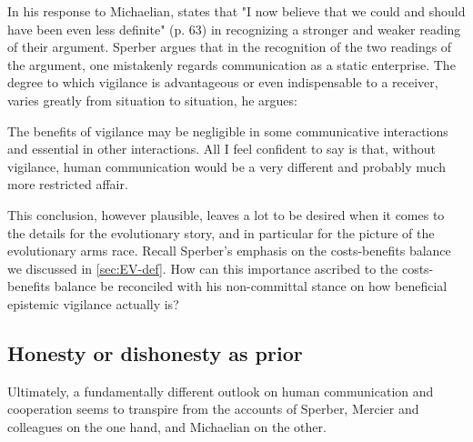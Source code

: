 In his response to Michaelian, \citet{Sperber13} states that "I now believe that we could and should have been even less definite" (p. 63) in recognizing a stronger and weaker reading of their argument. Sperber argues that in the recognition of the two readings of the argument, one mistakenly regards communication as a static enterprise. The degree to which vigilance is advantageous or even indispensable to a receiver, varies greatly from situation to situation, he argues:
\begin{quoting}
    The benefits of vigilance may be negligible in some communicative interactions and essential in other interactions. All I feel confident to say is that, without vigilance, human communication would be a very different and probably much more restricted affair.
    \hfill \citep[p.~63]{Sperber13}
\end{quoting}
This conclusion, however plausible, leaves a lot to be desired when it comes to the details for the evolutionary story, and in particular for the picture of the evolutionary arms race.
Recall Sperber's emphasis on the costs-benefits balance we discussed in \cref{sec:EV-def}. How can this importance ascribed to the costs-benefits balance be reconciled with his non-committal stance on how beneficial epistemic vigilance actually is?


\subsection{Honesty or dishonesty as prior}
\label{sec:honesty-dishonesty}

Ultimately, a fundamentally different outlook on human communication and cooperation seems to transpire from the accounts of Sperber, Mercier and colleagues on the one hand, and Michaelian on the other.


